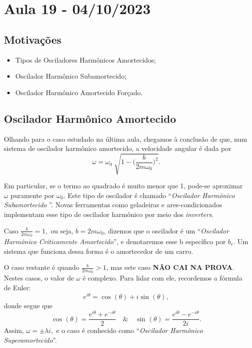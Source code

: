 \documentclass[PhysicsII/physicsII_notes.tex]{subfiles}
\begin{document}
\section{Aula 19 - 04/10/2023}
\subsection{Motivações}
\begin{itemize}
	\item Tipos de Osciladores Harmônicos Amortecidos;
	\item Oscilador Harmônico Subamortecido;
	\item Oscilador Harmônico Amortecido Forçado.
\end{itemize}
\subsection{Oscilador Harmônico Amortecido}
Olhando para o caso estudado na última aula, chegamos à conclusão de que, num sistema
de oscilador harmônico amortecido, a velocidade angular é dada por
\[
	\omega  = \omega_{0} \sqrt[]{1-\biggl(\frac{b}{2m\omega_{0}}\biggr)^{2}}.
\]

Em particular, se o termo ao quadrado é muito menor que 1, pode-se aproximar \(\omega \) puramente
por \(\omega_{0}\). Este tipo de oscilador é chamado ``\textit{Oscilador Harmônico Subamortecido} ''.
Novas ferramentas como geladeiras e ares-condicionados implementam esse tipo de oscilador harmônico por meio
dos \textit{inverters}.

Caso \(\frac{b}{2m\omega_{0}} = 1,\) ou seja, \(b = 2m\omega_{0}\), dizemos que o oscilador é um
``\textit{Oscilador Harmônico Criticamente Amortecido}'', e denotaremos esse b específico por \(b_{c}.\)
Um sistema que funciona dessa forma é o amortecedor de um carro.

O caso restante é quando \(\frac{b}{2m\omega_{0}} > 1\), mas este caso \textbf{NÃO CAI NA PROVA}. Nestes casos,
o valor de \(\omega \) é complexo. Para lidar com ele, recordemos a fórmula de Euler:
\[
	e^{i \theta } = \cos^{}{(\theta )} + i\sin^{}{(\theta )},
\]
donde segue que
\[
	\cos^{}{(\theta )} = \frac{e^{i\theta }+e^{-i\theta }}{2}\quad\&\quad \sin^{}{(\theta )} = \frac{e^{i\theta }-e^{-i\theta }}{2i}.
\]
Assim, \(\omega = \pm \lambda i,\) e o caso é conhecido como ``\textit{Oscilador Harmônico Superamortecido}''.
\end{document}
